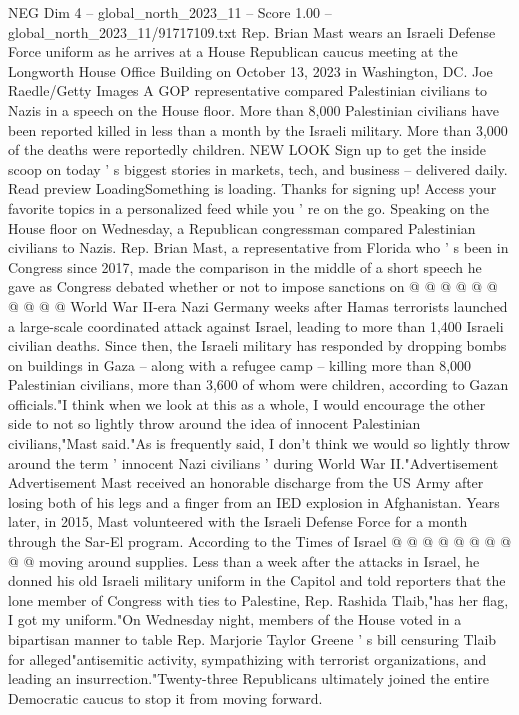 \begin{textsample}{NEG Dim 4 – global\_north\_2023\_11 – Score 1.00 – global\_north\_2023\_11/91717109.txt}  \label{ex:f4_neg_184}
Rep.
Brian Mast wears an Israeli Defense Force uniform as he arrives at a House Republican caucus meeting at the Longworth House Office Building on October 13, 2023 in Washington, DC.
Joe Raedle/Getty Images A GOP representative compared Palestinian civilians to Nazis in a speech on the House floor.
More than 8,000 Palestinian civilians have been reported killed in less than a month by the Israeli military.
More than 3,000 of the deaths were reportedly children.
NEW LOOK Sign up to get the inside scoop on today ' s biggest stories in markets, tech, and business -- delivered daily.
Read preview LoadingSomething is loading.
Thanks for signing up!
Access your favorite topics in a personalized feed while you ' re on the go.
Speaking on the House floor on Wednesday, a Republican congressman compared Palestinian civilians to Nazis.
Rep.
Brian Mast, a representative from Florida who ' s been in Congress since 2017, made the comparison in the middle of a short speech he gave as Congress debated whether or not to impose sanctions on @ @ @ @ @ @ @ @ @ @ World War II-era Nazi Germany weeks after Hamas terrorists launched a large-scale coordinated attack against Israel, leading to more than 1,400 Israeli civilian deaths.
Since then, the Israeli military has responded by dropping bombs on buildings in Gaza -- along with a refugee camp -- killing more than 8,000 Palestinian civilians, more than 3,600 of whom were children, according to Gazan officials."I think when we look at this as a whole, I would encourage the other side to not so lightly throw around the idea of innocent Palestinian civilians,"Mast said."As is frequently said, I don't think we would so lightly throw around the term ' innocent Nazi civilians ' during World War II."Advertisement Advertisement Mast received an honorable discharge from the US Army after losing both of his legs and a finger from an IED explosion in Afghanistan.
Years later, in 2015, Mast volunteered with the Israeli Defense Force for a month through the Sar-El program.
According to the Times of Israel @ @ @ @ @ @ @ @ @ @ moving around supplies.
Less than a week after the attacks in Israel, he donned his old Israeli military uniform in the Capitol and told reporters that the lone member of Congress with ties to Palestine, Rep.
Rashida Tlaib,"has her flag, I got my uniform."On Wednesday night, members of the House voted in a bipartisan manner to table Rep.
Marjorie Taylor Greene ' s bill censuring Tlaib for alleged"antisemitic activity, sympathizing with terrorist organizations, and leading an insurrection."Twenty-three Republicans ultimately joined the entire Democratic caucus to stop it from moving forward.

\end{textsample}
